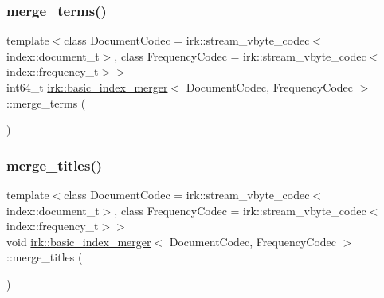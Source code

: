 \mbox{\label{classirk_1_1basic__index__merger_ab2f4a0b26b16dc7d63673814003bda4b}} 
\subsubsection{\texorpdfstring{merge\+\_\+terms()}{merge\_terms()}}
{\footnotesize\ttfamily template$<$class Document\+Codec  = irk\+::stream\+\_\+vbyte\+\_\+codec$<$index\+::document\+\_\+t$>$, class Frequency\+Codec  = irk\+::stream\+\_\+vbyte\+\_\+codec$<$index\+::frequency\+\_\+t$>$$>$ \\
int64\+\_\+t \mbox{\hyperlink{classirk_1_1basic__index__merger}{irk\+::basic\+\_\+index\+\_\+merger}}$<$ Document\+Codec, Frequency\+Codec $>$\+::merge\+\_\+terms (\begin{DoxyParamCaption}{ }\end{DoxyParamCaption})\hspace{0.3cm}{\ttfamily [inline]}}

\mbox{\label{classirk_1_1basic__index__merger_ab9772e2454466544841c08b245964736}} 
\subsubsection{\texorpdfstring{merge\+\_\+titles()}{merge\_titles()}}
{\footnotesize\ttfamily template$<$class Document\+Codec  = irk\+::stream\+\_\+vbyte\+\_\+codec$<$index\+::document\+\_\+t$>$, class Frequency\+Codec  = irk\+::stream\+\_\+vbyte\+\_\+codec$<$index\+::frequency\+\_\+t$>$$>$ \\
void \mbox{\hyperlink{classirk_1_1basic__index__merger}{irk\+::basic\+\_\+index\+\_\+merger}}$<$ Document\+Codec, Frequency\+Codec $>$\+::merge\+\_\+titles (\begin{DoxyParamCaption}{ }\end{DoxyParamCaption})\hspace{0.3cm}{\ttfamily [inline]}}

